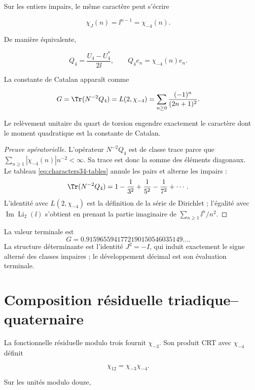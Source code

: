 Sur les entiers impairs, le même caractère peut s'écrire

\[
\chi_J(n)=\ii^{n-1}=\chi_{-4}(n).
\]

De manière équivalente,

\begin{equation}
Q_4=\frac{U_4-U_4^*}{2\ii},
\qquad Q_4e_n=\chi_{-4}(n)e_n.
\label{eq:Q4}
\end{equation}

La constante de Catalan apparaît comme

\begin{equation}
G=\Tr(N^{-2}Q_4)=L(2,\chi_{-4})
=\sum_{n\ge0}\frac{(-1)^n}{(2n+1)^2}.
\label{eq:catalan}
\end{equation}

Le relèvement unitaire du quart de torsion engendre exactement le
caractère dont le moment quadratique est la constante de Catalan.

\begin{proof}[Preuve opératorielle]
L'opérateur \(N^{-2}Q_4\) est de classe trace parce que
\(\sum_{n\ge1}|\chi_{-4}(n)|n^{-2}<\infty\). Sa trace est donc la
somme des éléments diagonaux. Le tableau \cref{eq:characters34-tables}
annule les pairs et alterne les impairs :
\[
\Tr(N^{-2}Q_4)
=1-\frac1{3^2}+\frac1{5^2}-\frac1{7^2}+\cdots.
\]
L'identité avec \(L(2,\chi_{-4})\) est la définition de la série de
Dirichlet ; l'égalité avec \(\operatorname{Im}\operatorname{Li}_2(\ii)\)
s'obtient en prenant la partie imaginaire de
\(\sum_{n\ge1}\ii^n/n^2\).
\end{proof}

La valeur terminale est
\[
G=0.9159655941772190150546035149\ldots.
\]
La structure déterminante est l'identité \(J^2=-I\), qui induit
exactement le signe alterné des classes impaires ; le développement décimal
est son évaluation terminale.

\section{Composition résiduelle triadique--quaternaire}

La fonctionnelle résiduelle modulo trois fournit \(\chi_{-3}\). Son produit
CRT avec \(\chi_{-4}\) définit

\begin{equation}
\chi_{12}=\chi_{-3}\chi_{-4}.
\label{eq:chi12}
\end{equation}

Sur les unités modulo douze,

